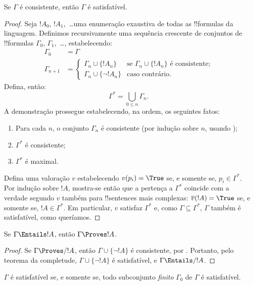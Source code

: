 \documentclass[../../../include/open-logic-section]{subfiles}
\begin{document}
\begin{thm}[Completude] 
Se $\Gamma$ é consistente, então $\Gamma$ é satisfatível.
\end{thm}

\begin{proof}
Seja $!A_0$, $!A_1$,~\dots uma enumeração exaustiva de todas as
!!{formula}s da linguagem. Definimos recursivamente uma sequência
crescente de conjuntos de !!{formula}s $\Gamma_0$, $\Gamma_1$,~\dots,
estabelecendo:
\begin{align*}
\Gamma_0 & = \Gamma\\
\Gamma_{n+1} &  =
\begin{cases}
  \Gamma_n \cup \{!A_n\} & \text{se $\Gamma_n \cup \{!A_n\}$ é
    consistente;}\\
  \Gamma_n \cup \{\lnot !A_n\} & \text{caso contrário}.
\end{cases}
\end{align*}
Defina, então:
\[
\Gamma^* = \bigcup_{0\le n}\Gamma_n.
\]
A demonstração prossegue estabelecendo, na ordem, os seguintes fatos:
\begin{enumerate}
\item Para cada $n$, o conjunto $\Gamma_n$ é consistente (por indução
  sobre $n$, usando );
\item $\Gamma^*$ é consistente;
\item $\Gamma^*$ é maximal.
\end{enumerate}
Defina uma valoração $v$ estabelecendo $v(p_i) = \True$ se, e somente
se, $p_i \in \Gamma^*$. Por indução sobre $!A$, mostra-se então que a
pertença a $\Gamma^*$ coincide com a verdade segundo $v$ também para
!!{sentence}s mais complexas: $\overline{v}(!A) = \True$ se, e somente
se, $!A \in \Gamma^*$. Em particular, $v$ satisfaz $\Gamma^*$ e, como
$\Gamma \subseteq \Gamma^*$, $\Gamma$ também é satisfatível, como
queríamos.
\end{proof}

\begin{cor}
Se $\Gamma \Entails !A$, então $\Gamma \Proves !A$.
\end{cor}

\begin{proof}
Se $\Gamma\Proves/ !A$, então $\Gamma \cup \{\lnot !A\}$ é consistente,
por . Portanto, pelo teorema da completude,
$\Gamma \cup \{\lnot !A\}$ é satisfatível, e $\Gamma \Entails/ !A$.
\end{proof}

\begin{prop}
$\Gamma$ é satisfatível se, e somente se, todo subconjunto \emph{finito}
$\Gamma_0$ de $\Gamma$ é satisfatível.
\end{prop}
\end{document}
